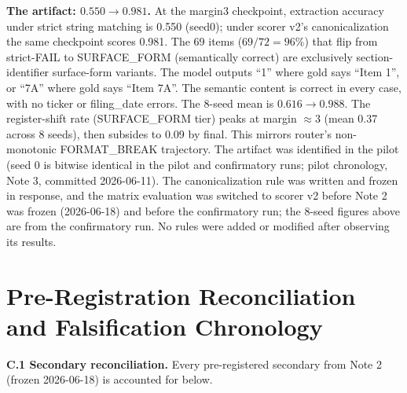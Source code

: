 \textbf{The artifact: $0.550 \to 0.981$.} At the margin3 checkpoint, extraction accuracy under strict string matching is 0.550 (seed0); under scorer v2's canonicalization the same checkpoint scores 0.981. The 69 items ($69/72 = 96\%$) that flip from strict-FAIL to SURFACE\_FORM (semantically correct) are exclusively section-identifier surface-form variants. The model outputs ``1'' where gold says ``Item 1'', or ``7A'' where gold says ``Item 7A''. The semantic content is correct in every case, with no ticker or filing\_date errors. The 8-seed mean is $0.616 \to 0.988$. The register-shift rate (SURFACE\_FORM tier) peaks at margin ${\approx}3$ (mean 0.37 across 8 seeds), then subsides to 0.09 by final. This mirrors router's non-monotonic FORMAT\_BREAK trajectory. The artifact was identified in the pilot (seed 0 is bitwise identical in the pilot and confirmatory runs; pilot chronology, Note 3, committed 2026-06-11). The canonicalization rule was written and frozen in response, and the matrix evaluation was switched to scorer v2 before Note 2 was frozen (2026-06-18) and before the confirmatory run; the 8-seed figures above are from the confirmatory run. No rules were added or modified after observing its results.

\section{Pre-Registration Reconciliation and Falsification Chronology}
\label{app:reconcile}
\textbf{C.1 Secondary reconciliation.} Every pre-registered secondary from Note 2 (frozen 2026-06-18) is accounted for below.

